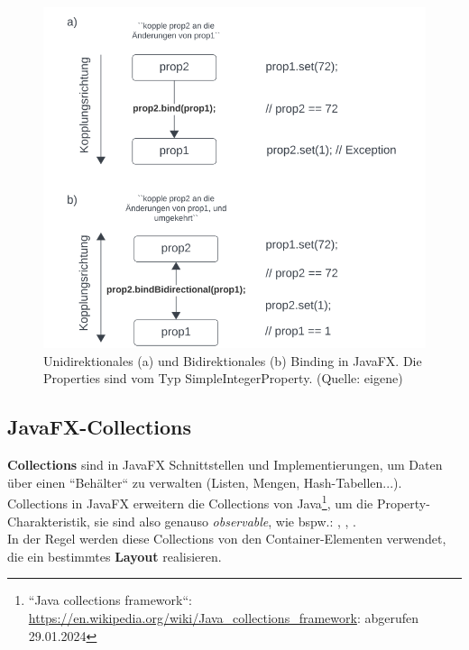 \begin{figure}
    \centering
    \includegraphics[scale=0.5]{chapters/fopt3/img/javafx/binding}
    \caption{Unidirektionales (a) und Bidirektionales (b) Binding in JavaFX. Die Properties sind vom Typ SimpleIntegerProperty. (Quelle: eigene)}
    \label{fig:binding}
\end{figure}

\subsection{JavaFX-Collections}

\textbf{Collections} sind in JavaFX Schnittstellen und Implementierungen, um Daten über einen ``Behälter`` zu verwalten (Listen, Mengen, Hash-Tabellen...).\\

\noindent
Collections in JavaFX erweitern die Collections von Java\footnote{
    ``Java collections framework``: \url{https://en.wikipedia.org/wiki/Java_collections_framework}: abgerufen 29.01.2024

}, um die Property-Charakteristik, sie sind also genauso \textit{observable}, wie bspw.: , , .\\

\noindent
In der Regel werden diese Collections von den Container-Elementen verwendet, die ein bestimmtes \textbf{Layout} realisieren.\\

